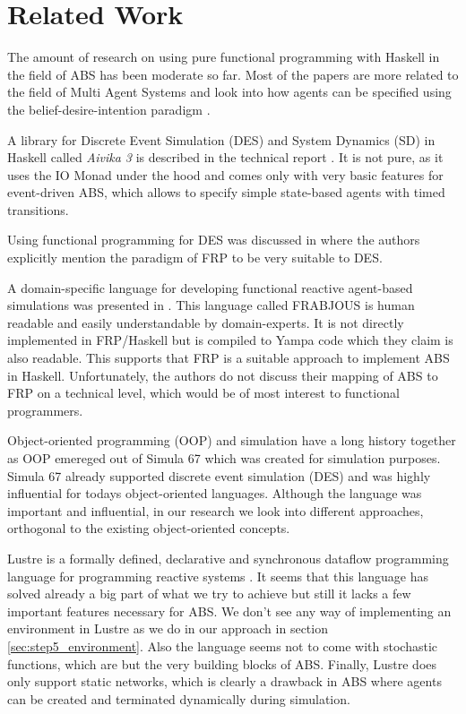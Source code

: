 \section{Related Work}
\label{sec:related_work}
The amount of research on using pure functional programming with Haskell in the field of ABS has been moderate so far. Most of the papers are more related to the field of Multi Agent Systems and look into how agents can be specified using the belief-desire-intention paradigm \cite{de_jong_suitability_2014, sulzmann_specifying_2007, jankovic_functional_2007}.

A library for Discrete Event Simulation (DES) and System Dynamics (SD) in Haskell called \textit{Aivika 3} is described in the technical report \cite{sorokin_aivika_2015}. It is not pure, as it uses the IO Monad under the hood and comes only with very basic features for event-driven ABS, which allows to specify simple state-based agents with timed transitions.

Using functional programming for DES was discussed in \cite{jankovic_functional_2007} where the authors explicitly mention the paradigm of FRP to be very suitable to DES.

A domain-specific language for developing functional reactive agent-based simulations was presented in \cite{vendrov_frabjous:_2014}. This language called FRABJOUS is human readable and easily understandable by domain-experts. It is not directly implemented in FRP/Haskell but is compiled to Yampa code which they claim is also readable. This supports that FRP is a suitable approach to implement ABS in Haskell. Unfortunately, the authors do not discuss their mapping of ABS to FRP on a technical level, which would be of most interest to functional programmers.

Object-oriented programming (OOP) and simulation have a long history together as OOP emereged out of Simula 67 \cite{dahl_birth_2002} which was created for simulation purposes. Simula 67 already supported discrete event simulation (DES) and was highly influential for todays object-oriented languages. Although the language was important and influential, in our research we look into different approaches, orthogonal to the existing object-oriented concepts.

Lustre is a formally defined, declarative and synchronous dataflow programming language for programming reactive systems \cite{halbwachs_synchronous_1991}. It seems that this language has solved already a big part of what we try to achieve but still it lacks a few important features necessary for ABS. We don't see any way of implementing an environment in Lustre as we do in our approach in section \ref{sec:step5_environment}. Also the language seems not to come with stochastic functions, which are but the very building blocks of ABS. Finally, Lustre does only support static networks, which is clearly a drawback in ABS where agents can be created and terminated dynamically during simulation.